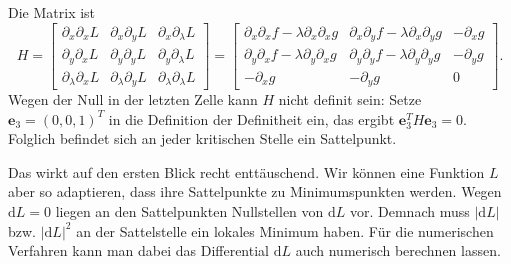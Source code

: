 Die Matrix ist
\begin{equation}
H = \begin{bmatrix}
\partial_x\partial_x L & \partial_x\partial_y L & \partial_x\partial_\lambda L\\
\partial_y\partial_x L & \partial_y\partial_y L & \partial_y\partial_\lambda L\\
\partial_\lambda\partial_x L & \partial_\lambda \partial_y L & \partial_\lambda\partial_\lambda L
\end{bmatrix}
= \begin{bmatrix}
\partial_x\partial_x f-\lambda\partial_x\partial_x g
& \partial_x\partial_y f-\lambda\partial_x\partial_y g
& -\partial_x g\\
\partial_y\partial_x f-\lambda\partial_y\partial_x g
& \partial_y\partial_y f-\lambda\partial_y\partial_y g
& -\partial_y g\\
-\partial_x g
& -\partial_y g
& 0
\end{bmatrix}.
\end{equation}
Wegen der Null in der letzten Zelle kann $H$ nicht definit sein:
Setze $\mathbf e_3=(0,0,1)^T$ in die Definition der Definitheit ein,
das ergibt $\mathbf e_3^T H\mathbf e_3 = 0$. Folglich befindet sich an
jeder kritischen Stelle ein Sattelpunkt.

Das wirkt auf den ersten Blick recht enttäuschend. Wir können
eine Funktion $L$ aber so adaptieren, dass ihre Sattelpunkte zu
Minimumspunkten werden. Wegen $\mathrm dL=0$ liegen an den
Sattelpunkten Nullstellen von $\mathrm dL$ vor. Demnach muss
$|\mathrm dL|$ bzw. $|\mathrm dL|^2$ an der Sattelstelle ein
lokales Minimum haben. Für die numerischen Verfahren kann man dabei
das Differential $\mathrm dL$ auch numerisch berechnen lassen.



